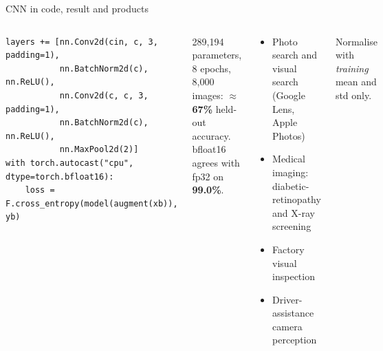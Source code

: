 \documentclass[aspectratio=169,11pt]{beamer}
\begin{document}
\begin{frame}[fragile]{CNN in code, result and products}
\begin{columns}[T]
\begin{bcode}
\begin{lstlisting}
layers += [nn.Conv2d(cin, c, 3, padding=1),
           nn.BatchNorm2d(c), nn.ReLU(),
           nn.Conv2d(c, c, 3, padding=1),
           nn.BatchNorm2d(c), nn.ReLU(),
           nn.MaxPool2d(2)]
with torch.autocast("cpu", dtype=torch.bfloat16):
    loss = F.cross_entropy(model(augment(xb)), yb)
\end{lstlisting}
\end{bcode}
\begin{bres}
289,194 parameters, 8 epochs, 8,000 images: \textbf{$\approx$67\%} held-out accuracy. bfloat16 agrees with fp32 on \textbf{99.0\%}.
\end{bres}
\begin{bapp}
\begin{itemize}
\item Photo search and visual search (Google Lens, Apple Photos)
\item Medical imaging: diabetic-retinopathy and X-ray screening
\item Factory visual inspection
\item Driver-assistance camera perception
\end{itemize}
\end{bapp}
\begin{bwarn}
Normalise with \emph{training} mean and std only.
\end{bwarn}
\end{columns}
\end{frame}

\end{document}
